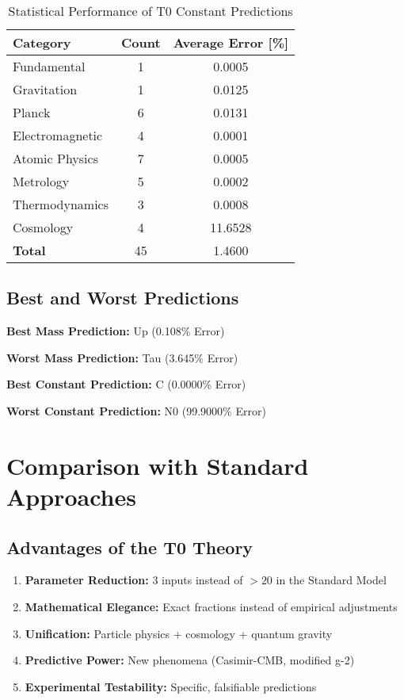\documentclass[11pt,a4paper]{article}
\begin{document}
	\begin{table}[h]
		\centering
		\begin{tabular}{>{\raggedright}p{4cm}cc}
			\toprule
			\textbf{Category} & \textbf{Count} & \textbf{Average Error [\%]} \\
			\midrule
			Fundamental & 1 & 0.0005 \\
			Gravitation & 1 & 0.0125 \\
			Planck & 6 & 0.0131 \\
			Electromagnetic & 4 & 0.0001 \\
			Atomic Physics & 7 & 0.0005 \\
			Metrology & 5 & 0.0002 \\
			Thermodynamics & 3 & 0.0008 \\
			Cosmology & 4 & 11.6528 \\
			\midrule
			\textbf{Total} & 45 & 1.4600 \\
			\bottomrule
		\end{tabular}
		\caption{Statistical Performance of T0 Constant Predictions}
	\end{table}
	
	\subsection{Best and Worst Predictions}
	
	\textbf{Best Mass Prediction:} Up (0.108\% Error)
	
	\textbf{Worst Mass Prediction:} Tau (3.645\% Error)
	
	\textbf{Best Constant Prediction:} C (0.0000\% Error)
	
	\textbf{Worst Constant Prediction:} N0 (99.9000\% Error)
	
	\section{Comparison with Standard Approaches}
	
	\subsection{Advantages of the T0 Theory}
	
	\begin{enumerate}
		\item \textbf{Parameter Reduction:} 3 inputs instead of $>20$ in the Standard Model
		\item \textbf{Mathematical Elegance:} Exact fractions instead of empirical adjustments
		\item \textbf{Unification:} Particle physics + cosmology + quantum gravity
		\item \textbf{Predictive Power:} New phenomena (Casimir-CMB, modified g-2)
		\item \textbf{Experimental Testability:} Specific, falsifiable predictions
	\end{enumerate}
	
\end{document}
